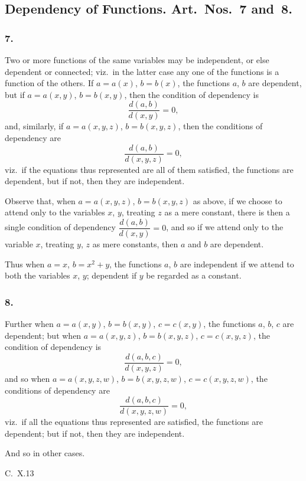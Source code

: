\documentclass[11pt,a4paper]{book}
\begin{document}
\subsection*{Dependency of Functions. Art.~Nos.~7 and~8.}

\subsubsection*{7.}

Two or more functions of the same variables may be independent, or else dependent or connected; viz.~in the latter case any one of the functions is a function of the others. If $a = a(x)$, $b = b(x)$, the functions $a$, $b$ are dependent, but if $a = a(x, y)$, $b = b(x, y)$, then the condition of dependency is
\[
\frac{d(a, b)}{d(x, y)} = 0,
\]
and, similarly, if $a = a(x, y, z)$, $b = b(x, y, z)$, then the conditions of dependency are
\[
\frac{d(a, b)}{d(x, y, z)} = 0,
\]
viz.~if the equations thus represented are all of them satisfied, the functions are dependent, but if not, then they are independent.

Observe that, when $a = a(x, y, z)$, $b = b(x, y, z)$ as above, if we choose to attend only to the variables $x$, $y$, treating $z$ as a mere constant, there is then a single condition of dependency $\dfrac{d(a, b)}{d(x, y)} = 0$, and so if we attend only to the variable $x$, treating $y$, $z$ as mere constants, then $a$ and $b$ are dependent.

Thus when $a = x$, $b = x^{2} + y$, the functions $a$, $b$ are independent if we attend to both the variables $x$, $y$; dependent if $y$ be regarded as a constant.

\subsubsection*{8.}

Further when $a = a(x, y)$, $b = b(x, y)$, $c = c(x, y)$, the functions $a$, $b$, $c$ are dependent; but when $a = a(x, y, z)$, $b = b(x, y, z)$, $c = c(x, y, z)$, the condition of dependency is
\[
\frac{d(a, b, c)}{d(x, y, z)} = 0,
\]
and so when $a = a(x, y, z, w)$, $b = b(x, y, z, w)$, $c = c(x, y, z, w)$, the conditions of dependency are
\[
\frac{d(a, b, c)}{d(x, y, z, w)} = 0,
\]
viz.~if all the equations thus represented are satisfied, the functions are dependent; but if not, then they are independent.

And so in other cases.

\medskip\noindent\textsc{C.~X.}\hfill 13
\end{document}
